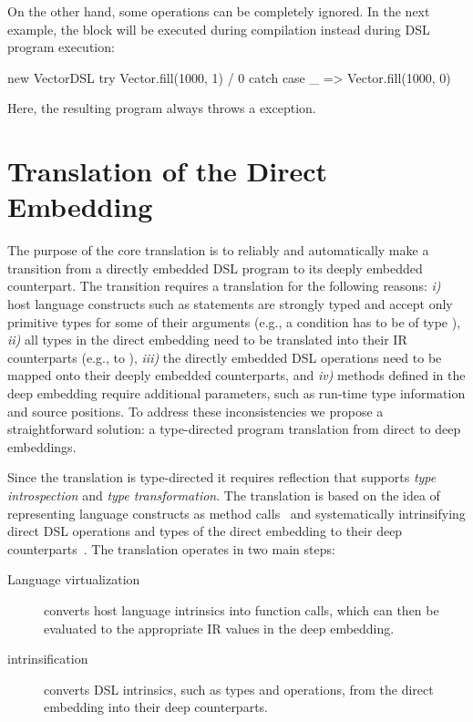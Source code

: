 On the other hand, some operations can be completely ignored. In the next
example, the  block will be executed during \edsl compilation
instead during DSL program execution:\vspace{3pt}

\begin{listingtiny}
  new VectorDSL {
    try Vector.fill(1000, 1) / 0
    catch { case _ => Vector.fill(1000, 0) }
  }
\end{listingtiny}

Here, the resulting program always throws a 
exception.

\section{Translation of the Direct Embedding}
\label{sec:translation}

The purpose of the core \yy translation is to reliably and automatically make
a transition from a directly embedded DSL program to its deeply embedded
counterpart. The transition requires a translation for the following reasons:
\emph{i)} host language constructs such as  statements are strongly
typed and accept only primitive types for some of their arguments (e.g., a
condition has to be of type ), \emph{ii)} all types in the direct
embedding need to be translated into their IR counterparts (e.g.,  to
), \emph{iii)} the directly embedded DSL operations need to be
mapped onto their deeply embedded counterparts, and \emph{iv)} methods defined
in the deep embedding require additional parameters, such as run-time type
information and source positions. To address these inconsistencies we propose a
straightforward solution: a type-directed program translation from direct to
deep embeddings.

Since the translation is type-directed it requires reflection that supports
 \emph{type introspection} and \emph{type transformation}. The translation is based on the idea of representing language constructs as method calls~\cite{carette_finally_2009,rompf_scala-virtualized:_2009} and systematically intrinsifying direct DSL operations and types of the direct embedding to their deep counterparts~\cite{carette_finally_2009}. The translation operates in two main steps:
\begin{description}
\item[Language virtualization] converts host language intrinsics into
  function calls, which can then be evaluated to the appropriate IR
  values in the deep embedding.
\item[\edsl{} intrinsification] converts DSL intrinsics, such as types and operations,
 from the direct embedding into their deep counterparts.
\end{description}

